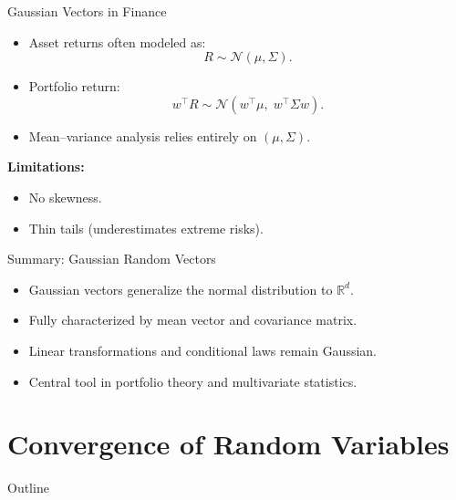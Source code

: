 \documentclass[aspectratio=169]{beamer}
\begin{document}

\begin{frame}{Gaussian Vectors in Finance}

\begin{itemize}
  \item Asset returns often modeled as:
  \[
    R \sim \mathcal{N}(\mu,\Sigma).
  \]\pause
  \item Portfolio return:
  \[
    w^\top R \sim \mathcal{N}(w^\top\mu,\; w^\top\Sigma w).
  \]\pause
  \item Mean–variance analysis relies entirely on \((\mu,\Sigma)\).
\end{itemize}

\medskip

\textbf{Limitations:}
\begin{itemize}
  \item No skewness.
  \item Thin tails (underestimates extreme risks).
\end{itemize}

\end{frame}


\begin{frame}{Summary: Gaussian Random Vectors}

\begin{itemize}
  \item Gaussian vectors generalize the normal distribution to \(\mathbb{R}^d\).\pause
  \item Fully characterized by mean vector and covariance matrix.\pause
  \item Linear transformations and conditional laws remain Gaussian.\pause
  \item Central tool in portfolio theory and multivariate statistics.
\end{itemize}

\end{frame}
\section{Convergence of Random Variables}

\begin{frame}{Outline}
\end{frame}
\end{document}
